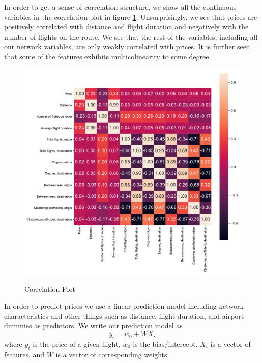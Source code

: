 In order to get a sense of correlation structure, we show all the continuous variables in the correlation plot in figure \ref{fig:correl}. Unsurprisingly, we see that prices are positively correlated with distance and flight duration and negatively with the number of flights on the route. We see that the rest of the variables, including all our network variables, are only weakly correlated with prices. It is further seen that some of the features exhibits multicolinearity to some degree.

\begin{figure}[H]
  \centering
  \caption{Correlation Plot}
    \includegraphics[width=1. \textwidth]{Exam/Figures/corr_plot.pdf}
  \label{fig:correl}
\end{figure}

In order to predict prices we use a linear prediction model including network characteristics and other things such as distance, flight duration, and airport dummies as predictors.
We write our prediction model as
$$
y_i = w_0 + W X_i 
$$
where $y_i$ is the price of a given flight, $w_0$ is the bias/intercept, $X_i$ is a vector of features, and $W$ is a vector of corresponding weights. 

